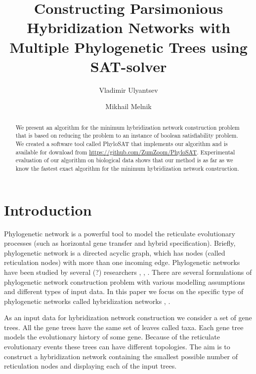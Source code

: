 \documentclass[runningheads, envcountsame, a4paper]{llncs}
\begin{document}
\mainmatter           
\title{Constructing Parsimonious Hybridization Networks with Multiple Phylogenetic Trees using SAT-solver}
\titlerunning{ } 
\toctitle{ }

\author{Vladimir Ulyantsev \and Mikhail Melnik}

\maketitle
\setcounter{footnote}{0}

\begin{abstract}
  We present an algorithm for the minimum hybridization network construction problem that is based on reducing 
  the problem to an instance of boolean satisfiability problem. We created a software tool called PhyloSAT  
  that implements our algorithm and is available for download from \url{https://github.com/ZumZoom/PhyloSAT}.
  Experimental evaluation of our algorithm on biological data shows that our method is as far as we know the 
  fastest exact algorithm for the minimum hybridization network construction.

\end{abstract}

\section{Introduction}

Phylogenetic network is a powerful tool to model the reticulate
evolutionary processes (such as horizontal gene transfer and hybrid specification).
Briefly, phylogenetic network is a directed acyclic graph, which has
nodes (called reticulation nodes) with more than one incoming edge. Phylogenetic
networks have been studied by several (?) researchers \cite{huson2010phylogenetic}, \cite{morrison2011introduction}, 
\cite{nakhleh2011evolutionary}. There are several formulations of phylogenetic network
construction problem with various modelling assumptions and different types of input data. 
In this paper we focus on the specific type of phylogenetic networks called hybridization
networks \cite{semple2006hybridization}, \cite{chen2010hybridnet}.

As an input data for hybridization network construction we consider a set of gene trees. 
All the gene trees have the same set of leaves called taxa.
Each gene tree models the evolutionary history of some gene. 
Because of the reticulate evolutionary events these trees can have different topologies.
The aim is to construct a hybridization network containing the smallest possible number of 
reticulation nodes and displaying each of the input trees. 
\end{document}
